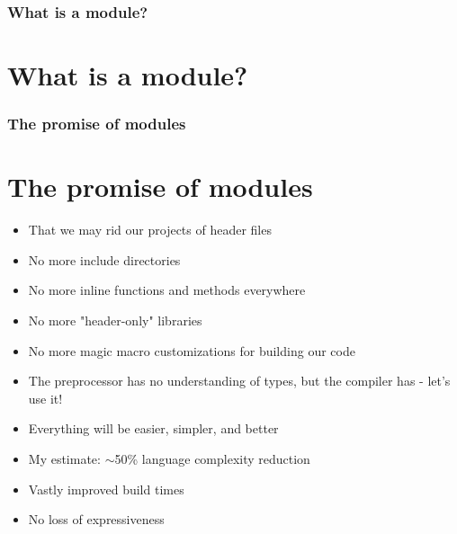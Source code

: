 \documentclass{beamer}
\begin{document}
%
%
\begin{frame}[plain]
\frametitle{What is a module?}
\section{What is a module?}
\end{frame}


%
%
\begin{frame}[plain]
\frametitle{The promise of modules}
\section{The promise of modules}
\begin{itemize}
\item That we may rid our projects of header files
\item No more include directories
\item No more inline functions and methods everywhere
\item No more "header-only" libraries
\item No more magic macro customizations for building our code
\item The preprocessor has no understanding of types, but the compiler
has - let's use it!
\item Everything will be easier, simpler, and better
\item My estimate: $\sim$50\% language complexity reduction
\item Vastly improved build times
\item No loss of expressiveness
\end{itemize}
\end{frame}
\end{document}
